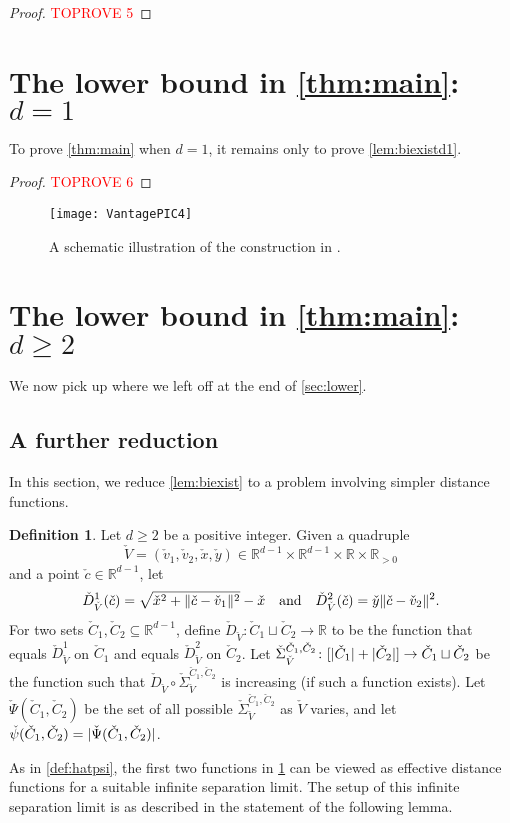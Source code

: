 \documentclass[11pt]{amsart}
\theoremstyle{definition}
\newtheorem{definition}[theorem]{Definition}
\DeclarePairedDelimiter{\abs}{\lvert}{\rvert}
\DeclarePairedDelimiter{\Abs}{\lVert}{\rVert}
\newcommand{\RR}{\mathbb{R}}
\begin{document}
\begin{proof}\textcolor{red}{TOPROVE 5}\end{proof}
\section{The lower bound in \texorpdfstring{\cref{thm:main}}{Theorem \ref{thm:main}}: \texorpdfstring{$d = 1$}{d = 1}} \label{sec:lowerd1}
To prove \cref{thm:main} when $d=1$, it remains only to prove \cref{lem:biexistd1}.
\begin{proof}\textcolor{red}{TOPROVE 6}\end{proof}

\begin{figure}[tbp]
\begin{center}{\texttt{[image: VantagePIC4]}}
\end{center}
\caption{A schematic illustration of the construction in .} 
\label{fig:section5}
\end{figure}

\section{The lower bound in \texorpdfstring{\cref{thm:main}}{Theorem \ref{thm:main}}: \texorpdfstring{$d \geq 2$}{d ≥ 2}} \label{sec:lowerdg2}
We now pick up where we left off at the end of \cref{sec:lower}.
\subsection{A further reduction}
In this section, we reduce \cref{lem:biexist} to a problem involving simpler distance functions.
\begin{definition}\label{def:check}
Let $d \geq 2$ be a positive integer. Given a quadruple \[\check V = (\check v_1, \check v_2, \check x, \check y) \in \RR^{d-1} \times \RR^{d-1} \times \RR \times \RR_{>0}\] and a point $\check c \in \RR^{d-1}$, let
\[\check D^1_{\check V}(\check c) = \sqrt{\check x^2 + \Abs{\check c - \check v_1}^2} - \check x \quad\text{and}\quad \check D^2_{\check V}(\check c) = \check y\Abs{\check c - \check v_2}^2.\]
For two sets $\check C_1,\check C_2 \subseteq \RR^{d-1}$, define $\check D_{\check V} \colon \check C_1 \sqcup \check C_2 \to \RR$ to be the function that equals $\check D_{\check V}^1$ on $\check C_1$ and equals $\check D_{\check 
V}^2$ on $\check C_2$.  Let $\check \Sigma_{\check V}^{\check C_1,\check C_2} \colon [\abs{\check C_1} + \abs{\check C_2}] \to \check C_1 \sqcup \check C_2$ be the function such that $\check D_{\check V} \circ \check \Sigma_{\check V}^{\check C_1,\check C_2}$ is increasing (if such a function exists). Let $\check \Psi(\check C_1,\check C_2)$ be the set of all possible $\check \Sigma_{\check V}^{\check C_1,\check C_2}$ as $\check V$ varies, and let $\check \psi(\check C_1,\check C_2) = \abs{\check \Psi(\check C_1,\check C_2)}$.
\end{definition}
As in \cref{def:hatpsi}, the first two functions in \cref{def:check} can be viewed as effective distance functions for a suitable infinite separation limit.  The setup of this infinite separation limit is as described in the statement of the following lemma.
\end{document}
